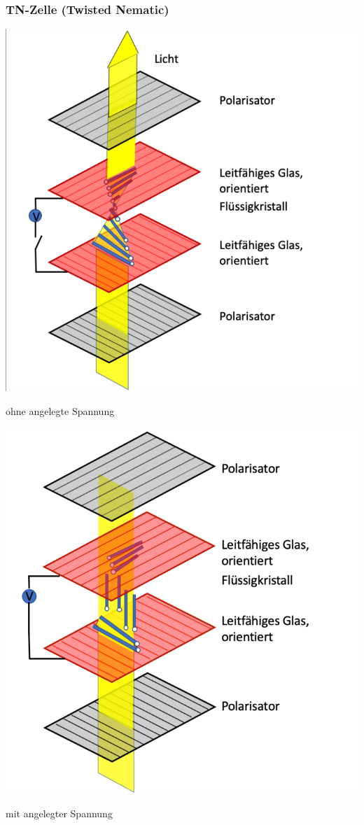 \subsubsection{TN-Zelle (Twisted Nematic)}
\begin{minipage}{0.48\linewidth}
	\begin{center}
		\includegraphics[width=0.8\linewidth]{images/TN-Zelle1.png}
		
		ohne angelegte Spannung   
	\end{center}
\end{minipage}
\hfill
\begin{minipage}{0.48\linewidth}
	\begin{center}
		\includegraphics[width=0.8\linewidth]{images/TN-Zelle2.png} 
		
		mit angelegter Spannung 
	\end{center}
\end{minipage}



